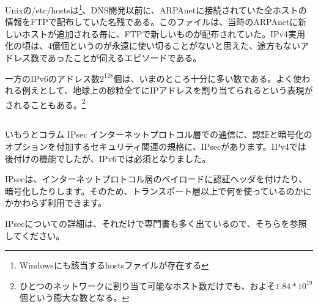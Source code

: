 Unixの/etc/hostsは\footnote{Windowsにも該当するhostsファイルが存在する}、DNS開発以前に、ARPAnetに接続されていた全ホストの情報をFTPで配布していた名残である。このファイルは、当時のARPAnetに新しいホストが追加される毎に、FTPで新しいものが配布されていた。IPv4実用化の頃は、4億個というのが永遠に使い切ることがないと思えた、途方もないアドレス数であったことが伺えるエピソードである。

一方のIPv6のアドレス数$2^{128}$個は、いまのところ十分に多い数である。よく使われる例えとして、地球上の砂粒全てにIPアドレスを割り当てられるという表現がされることもある。\footnote{ひとつのネットワークに割り当て可能なホスト数だけでも、およそ$1.84*10^{19}$個という膨大な数となる。}

\subsection*{}
\begin{itembox}[l]{いもうとコラム IPsec}
インターネットプロトコル層での通信に、認証と暗号化のオプションを付加するセキュリティ関連の規格に、IPsecがあります。IPv4では後付けの機能でしたが、IPv6では必須となりました。

IPsecは、インターネットプロトコル層のペイロードに認証ヘッダを付けたり、暗号化したりします。そのため、トランスポート層以上で何を使っているのかにかかわらず利用できます。

IPsecについての詳細は、それだけで専門書も多く出ているので、そちらを参照してください。


\end{itembox}